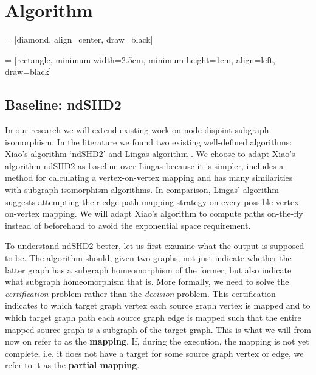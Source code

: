 \chapter{Algorithm}

 = [diamond, align=center, draw=black]

 = [rectangle, minimum width=2.5cm, minimum height=1cm, align=left, draw=black]


\section{Baseline: ndSHD2}
In our research we will extend existing work on node disjoint subgraph isomorphism. In the literature we found two existing well-defined algorithms: Xiao's algorithm `ndSHD2' \cite{XIAONODEDISJOINT} and Lingas algorithm \cite{LINGAS2009464}. We choose to adapt Xiao's algorithm ndSHD2 as baseline over Lingas because it is simpler, includes a method for calculating a vertex-on-vertex mapping and has many similarities with subgraph isomorphism algorithms. In comparison, Lingas' algorithm suggests attempting their edge-path mapping strategy on every possible vertex-on-vertex mapping. We will adapt Xiao's algorithm to compute paths on-the-fly instead of beforehand to avoid the exponential space requirement.

To understand ndSHD2 better, let us first examine what the output is supposed to be. The algorithm should, given two graphs, not just indicate whether the latter graph has a subgraph homeomorphism of the former, but also indicate what subgraph homeomorphism that is. More formally, we need to solve the \textit{certification} problem rather than the \textit{decision} problem. This certification indicates to which target graph vertex each source graph vertex is mapped and to which target graph path each source graph edge is mapped such that the entire mapped source graph is a subgraph of the target graph. This is what we will from now on refer to as the \textbf{mapping}. If, during the execution, the mapping is not yet complete, i.e. it does not have a target for some source graph vertex or edge, we refer to it as the \textbf{partial mapping}.

